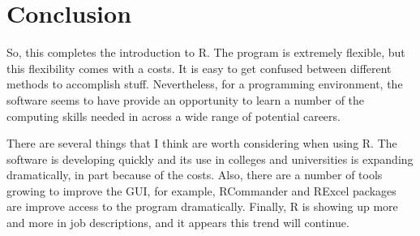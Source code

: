 \documentclass{tufte-handout}\usepackage[]{graphicx}\usepackage[]{xcolor}
\begin{document}
\section{Conclusion}
So, this completes the introduction to R. The program is extremely flexible, but this flexibility comes with a costs. It is easy to get confused between different methods to accomplish stuff. Nevertheless, for a programming environment, the software seems to have provide an opportunity to learn a number of the computing skills needed in across a wide range of potential careers. 

There are several things that I think are worth considering when using R. The software is developing quickly and its use in colleges and universities is expanding dramatically, in part because of the costs. Also, there are a number of tools growing to improve the GUI, for example, RCommander and RExcel packages are improve access to the program dramatically. Finally, R is showing up more and more in job descriptions, and it appears this trend will continue. 
\clearpage

\FloatBarrier 
\begin{fullwidth}


\end{fullwidth}
\end{document}
